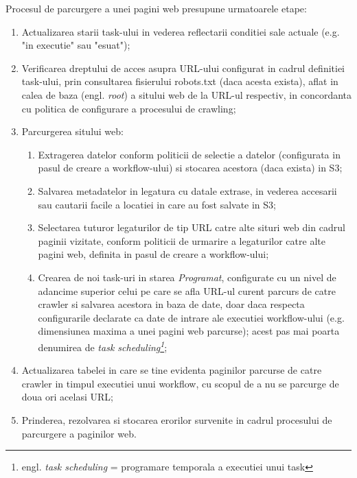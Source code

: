 Procesul de parcurgere a unei pagini web presupune urmatoarele etape:

\begin{enumerate}
	\item{Actualizarea starii task-ului in vederea reflectarii conditiei sale actuale (e.g. "in executie" sau "esuat");}
	
	\item{Verificarea dreptului de acces asupra URL-ului configurat in cadrul definitiei task-ului, prin consultarea fisierului robots.txt (daca acesta exista), aflat in calea de baza (engl. \textit{root}) a sitului web de la URL-ul respectiv, in concordanta cu politica de configurare a procesului de crawling;}
	
	\item{Parcurgerea sitului web:}
	\begin{enumerate}
		\item{Extragerea datelor conform politicii de selectie a datelor (configurata in pasul de creare a workflow-ului) si stocarea acestora (daca exista) in S3;}
		
		\item{Salvarea metadatelor in legatura cu datale extrase, in vederea accesarii sau cautarii facile a locatiei in care au fost salvate in S3;}
		
		\item{Selectarea tuturor legaturilor de tip URL catre alte situri web din cadrul paginii vizitate, conform politicii de urmarire a legaturilor catre alte pagini web, definita in pasul de creare a workflow-ului;}
		
		\item{Crearea de noi task-uri in starea \textit{Programat}, configurate cu un nivel de adancime superior celui pe care se afla URL-ul curent parcurs de catre crawler si salvarea acestora in baza de date, doar daca respecta configurarile declarate ca date de intrare ale executiei workflow-ului (e.g. dimensiunea maxima a unei pagini web parcurse); acest pas mai poarta denumirea de \textit{task scheduling\footnote{engl. \textit{task scheduling} = programare temporala a executiei unui task}};}
		
	\end{enumerate}
	
	\item{Actualizarea tabelei in care se tine evidenta paginilor parcurse de catre crawler in timpul executiei unui workflow, cu scopul de a nu se parcurge de doua ori acelasi URL;}
		
	\item{Prinderea, rezolvarea si stocarea erorilor survenite in cadrul procesului de parcurgere a paginilor web.}
	
\end{enumerate}

